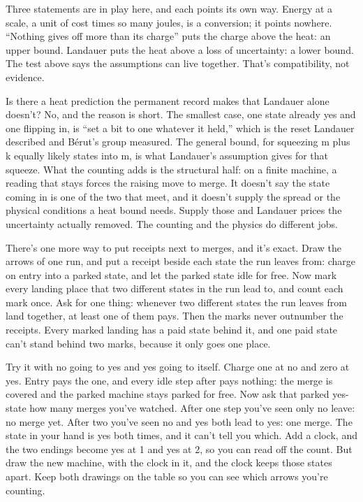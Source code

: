 \documentclass[11pt,twoside]{article}
\theoremstyle{thielethm}
\theoremstyle{thieledef}
\theoremstyle{thieledef}
\theoremstyle{thieledef}
\theoremstyle{thielethm}
\theoremstyle{thieleobs}
\theoremstyle{thielethm}
\begin{document}
Three statements are in play here, and each points its own way. Energy at a scale, a unit of cost times so many joules, is a conversion; it points nowhere. ``Nothing gives off more than its charge'' puts the charge above the heat: an upper bound. Landauer puts the heat above a loss of uncertainty: a lower bound. The test above says the assumptions can live together. That's compatibility, not evidence.

Is there a heat prediction the permanent record makes that Landauer alone doesn't? No, and the reason is short. The smallest case, one state already yes and one flipping in, is ``set a bit to one whatever it held,'' which is the reset Landauer described and Bérut's group measured. The general bound, for squeezing m plus k equally likely states into m, is what Landauer's assumption gives for that squeeze. What the counting adds is the structural half: on a finite machine, a reading that stays forces the raising move to merge. It doesn't say the state coming in is one of the two that meet, and it doesn't supply the spread or the physical conditions a heat bound needs. Supply those and Landauer prices the uncertainty actually removed. The counting and the physics do different jobs.

There's one more way to put receipts next to merges, and it's exact. Draw the arrows of one run, and put a receipt beside each state the run leaves from: charge on entry into a parked state, and let the parked state idle for free. Now mark every landing place that two different states in the run lead to, and count each mark once. Ask for one thing: whenever two different states the run leaves from land together, at least one of them pays. Then the marks never outnumber the receipts. Every marked landing has a paid state behind it, and one paid state can't stand behind two marks, because it only goes one place.

Try it with no going to yes and yes going to itself. Charge one at no and zero at yes. Entry pays the one, and every idle step after pays nothing: the merge is covered and the parked machine stays parked for free. Now ask that parked yes-state how many merges you've watched. After one step you've seen only no leave: no merge yet. After two you've seen no and yes both lead to yes: one merge. The state in your hand is yes both times, and it can't tell you which. Add a clock, and the two endings become yes at 1 and yes at 2, so you can read off the count. But draw the new machine, with the clock in it, and the clock keeps those states apart. Keep both drawings on the table so you can see which arrows you're counting.
\end{document}
